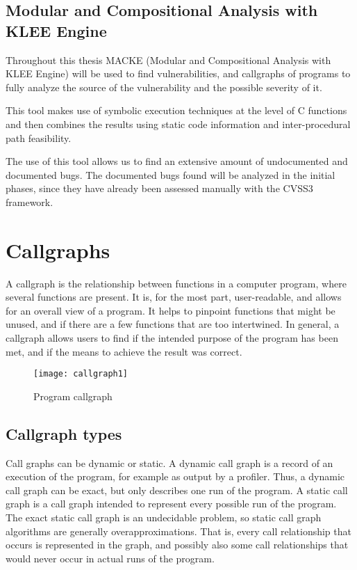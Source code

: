 \subsection{Modular and Compositional Analysis with KLEE Engine}

Throughout this thesis MACKE (Modular and Compositional Analysis with KLEE Engine)\parencite{ognawala} will be used to find vulnerabilities, and callgraphs of programs to fully analyze the source of the vulnerability and the possible severity of it.

This tool makes use of symbolic execution techniques at the level of C functions and then combines the results using static code information and inter-procedural path feasibility\parencite{ognawala}.

The use of this tool allows us to find an extensive amount of undocumented and documented bugs. The documented bugs found will be analyzed in the initial phases, since they have already been assessed manually with the CVSS3 framework.

\section{Callgraphs}

A callgraph\parencite{dataFlow} is the relationship between functions in a computer program, where several functions are present. It is, for the most part, user-readable, and allows for an overall view of a program. It helps to pinpoint functions that might be unused, and if there are a few functions that are too intertwined. In general, a callgraph allows users to find if the intended purpose of the program has been met, and if the means to achieve the result was correct.

\begin{figure}[H]
	\caption{Program callgraph}
	\centering
	\texttt{[image: callgraph1]}
\end{figure}

\subsection{Callgraph types}

Call graphs can be dynamic or static. A dynamic call graph is a record of an execution of the program, for example as output by a profiler. Thus, a dynamic call graph can be exact, but only describes one run of the program. A static call graph is a call graph intended to represent every possible run of the program. The exact static call graph is an undecidable problem, so static call graph algorithms are generally overapproximations. That is, every call relationship that occurs is represented in the graph, and possibly also some call relationships that would never occur in actual runs of the program.

